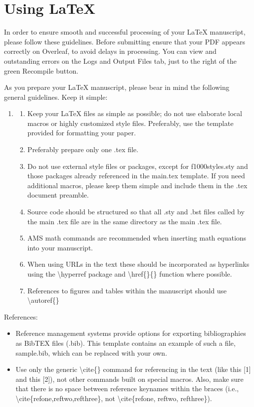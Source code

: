 \documentclass[10pt,a4paper]{article}
\begin{document}
\section*{Using LaTeX}
In order to ensure smooth and successful processing of your LaTeX manuscript, please follow these guidelines. Before submitting ensure that your PDF appears correctly on Overleaf, to avoid delays in processing. You can view and outstanding errors on the Logs and Output Files tab, just to the right of the green Recompile button.

As you prepare your LaTeX manuscript, please bear in mind the following general guidelines.  
Keep it simple:

\begin{enumerate}
    \item[~]
	\begin{enumerate}
		\item Keep your LaTeX files as simple as possible; do not use elaborate local macros or highly customized style files. Preferably, use the template provided for formatting your paper.
		\item Preferably prepare only one .tex file. 
		\item Do not use external style files or packages, except for f1000styles.sty and those packages already referenced in the main.tex template. If you need additional macros, please keep them simple and include them in the .tex document preamble.
		\item Source code should be structured so that all .sty and .bst files called by the main .tex file are in the same directory as the main .tex file.
		\item AMS math commands are recommended when inserting math equations into your manuscript.
		\item When using URLs in the text these should be incorporated as hyperlinks using the \textbackslash hyperref package and \textbackslash href\{\}\{\} function where possible.
		\item References to figures and tables within the manuscript should use \textbackslash autoref\{\}
	\end{enumerate}
\end{enumerate}

References:
\begin{itemize}
	\item Reference management systems provide options for exporting bibliographies as BibTEX files (.bib). This template contains an example of such a file, sample.bib, which can be replaced with your own.
	\item Use only the generic \textbackslash cite\{\} command for referencing in the text (like this [1] and this [2]), not other commands built on special macros. Also, make sure that there is no space between reference keynames within the braces (i.e., \textbackslash cite\{refone,reftwo,refthree\}, not \textbackslash cite\{refone, reftwo, refthree\}).
\end{itemize}
\end{document}
